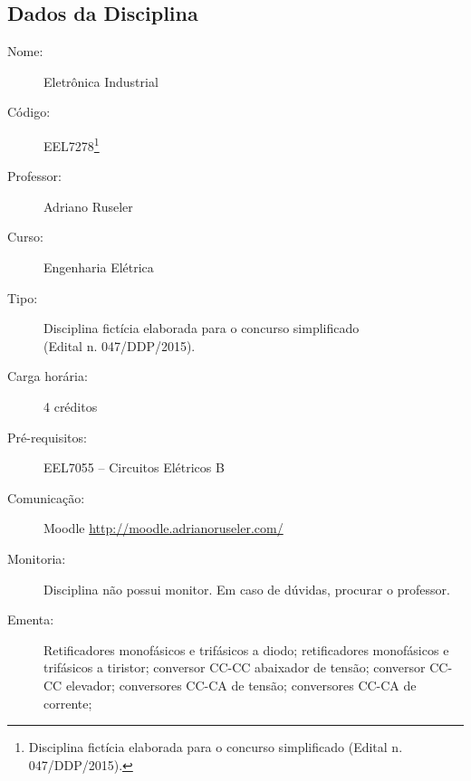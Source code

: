 \documentclass[
	article,			%
	12pt,				%
	twoside,			%
	a4paper,			%
	english,			%
	brazil,				%
	sumario=tradicional
]{abntex2-modelo-plano-de-aula}
\begin{document}

\frenchspacing 


\imprimircapaUFSC 






\textual
\pagestyle{notasUFSC}



\begin{mdframed}[style=mdfexample2]	\center
	\section{Dados da Disciplina} %
\end{mdframed}

\begin{description}
	\item[Nome:]  Eletrônica Industrial
	\item[Código:] EEL7278\footnote{ Disciplina fictícia elaborada para o concurso simplificado (Edital n. 047/DDP/2015).} 
	\item[Professor:] Adriano Ruseler
	\item[Curso:] Engenharia Elétrica
	\item[Tipo:] Disciplina fictícia elaborada para o concurso simplificado  \\(Edital n. 047/DDP/2015).
	\item[Carga horária:] 4 créditos
	\item[Pré-requisitos:] EEL7055	-- Circuitos Elétricos B
	\item[Comunicação:] Moodle \url{http://moodle.adrianoruseler.com/}
	\item[Monitoria: ] Disciplina não possui monitor. Em caso de dúvidas, procurar o professor. 
	\item[Ementa:]Retificadores monofásicos e trifásicos a diodo; retificadores monofásicos e trifásicos a tiristor; conversor CC-CC abaixador de tensão; conversor CC-CC elevador; conversores CC-CA de tensão; conversores CC-CA de corrente;
\end{description}
\end{document}
